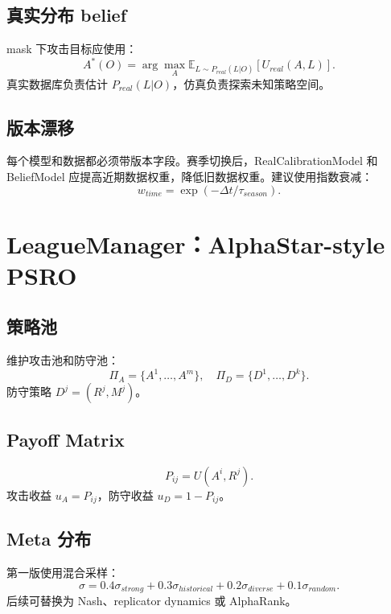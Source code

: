 \documentclass[UTF8,12pt,openany]{ctexbook}
\newcommand{\E}{\mathbb{E}}
\begin{document}
\section{真实分布 belief}
mask 下攻击目标应使用：
\begin{equation}
A^*(O)=\arg\max_A\E_{L\sim P_{real}(L|O)}[U_{real}(A,L)].
\end{equation}
真实数据库负责估计 $P_{real}(L|O)$，仿真负责探索未知策略空间。

\section{版本漂移}
每个模型和数据都必须带版本字段。赛季切换后，RealCalibrationModel 和 BeliefModel 应提高近期数据权重，降低旧数据权重。建议使用指数衰减：
\begin{equation}
w_{time}=\exp(-\Delta t/\tau_{season}).
\end{equation}


\chapter{LeagueManager：AlphaStar-style PSRO}

\section{策略池}
维护攻击池和防守池：
\begin{equation}
\Pi_A=\{A^1,\ldots,A^m\},\quad \Pi_D=\{D^1,\ldots,D^k\}.
\end{equation}
防守策略 $D^j=(R^j,M^j)$。

\section{Payoff Matrix}
\begin{equation}
P_{ij}=U(A^i,R^j).
\end{equation}
攻击收益 $u_A=P_{ij}$，防守收益 $u_D=1-P_{ij}$。

\section{Meta 分布}
第一版使用混合采样：
\begin{equation}
\sigma=0.4\sigma_{strong}+0.3\sigma_{historical}+0.2\sigma_{diverse}+0.1\sigma_{random}.
\end{equation}
后续可替换为 Nash、replicator dynamics 或 AlphaRank。
\end{document}
